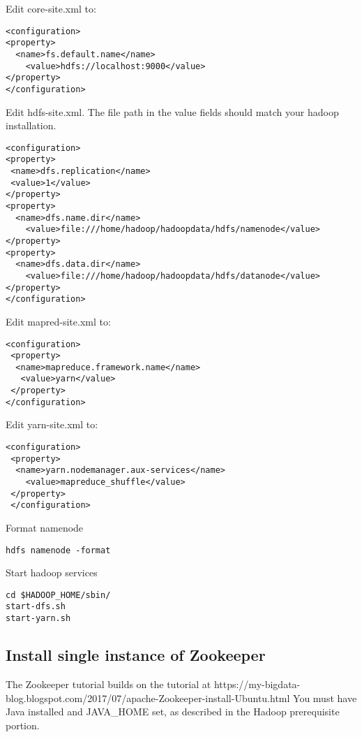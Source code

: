 Edit core-site.xml to:

\begin{lstlisting}
<configuration>
<property>
  <name>fs.default.name</name>
    <value>hdfs://localhost:9000</value>
</property>
</configuration>
\end{lstlisting}

Edit hdfs-site.xml. The file path in the value fields should match your
hadoop installation.

\begin{lstlisting}
<configuration>
<property>
 <name>dfs.replication</name>
 <value>1</value>
</property>
<property>
  <name>dfs.name.dir</name>
    <value>file:///home/hadoop/hadoopdata/hdfs/namenode</value>
</property>
<property>
  <name>dfs.data.dir</name>
    <value>file:///home/hadoop/hadoopdata/hdfs/datanode</value>
</property>
</configuration>
\end{lstlisting}

Edit mapred-site.xml to:

\begin{lstlisting}
<configuration>
 <property>
  <name>mapreduce.framework.name</name>
   <value>yarn</value>
 </property>
</configuration>
\end{lstlisting}

Edit yarn-site.xml to:

\begin{lstlisting}
<configuration>
 <property>
  <name>yarn.nodemanager.aux-services</name>
    <value>mapreduce_shuffle</value>
 </property>
 </configuration>
\end{lstlisting}

Format namenode

\begin{lstlisting}
hdfs namenode -format
\end{lstlisting}

Start hadoop services

\begin{lstlisting}
cd $HADOOP_HOME/sbin/
start-dfs.sh
start-yarn.sh
\end{lstlisting}

\subsection{Install single instance of Zookeeper}

The Zookeeper tutorial builds on the tutorial at
https://my-bigdata-blog.blogspot.com/2017/07/apache-Zookeeper-install-Ubuntu.html
You must have Java installed and JAVA\_HOME set, as described in the
Hadoop prerequisite portion.

